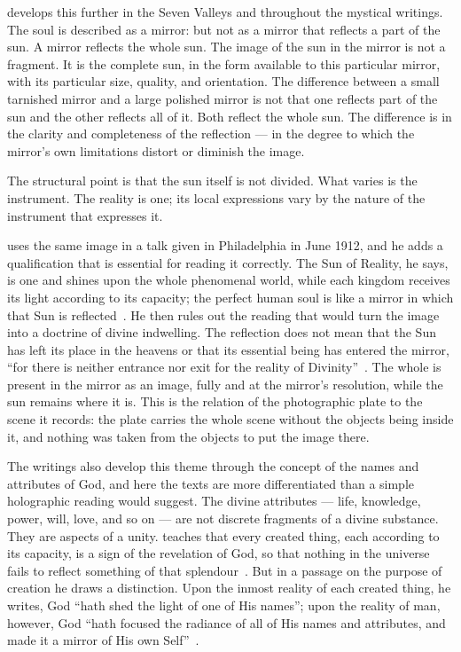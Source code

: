 \Bahaullah develops this further in the Seven Valleys and throughout the mystical writings.
The soul is described as a mirror: but not as a mirror that reflects a part of the sun.
A mirror reflects the whole sun.
The image of the sun in the mirror is not a fragment.
It is the complete sun, in the form available to this particular mirror, with its particular size, quality, and orientation.
The difference between a small tarnished mirror and a large polished mirror is not that one reflects part of the sun and the other reflects all of it.
Both reflect the whole sun.
The difference is in the clarity and completeness of the reflection --- in the degree to which the mirror's own limitations distort or diminish the image.

The structural point is that the sun itself is not divided.
What varies is the instrument.
The reality is one; its local expressions vary by the nature of the instrument that expresses it.

\AbdulBaha uses the same image in a talk given in Philadelphia in June 1912, and he adds a qualification that is essential for reading it correctly.
The Sun of Reality, he says, is one and shines upon the whole phenomenal world, while each kingdom receives its light according to its capacity; the perfect human soul is like a mirror in which that Sun is reflected~\citep[Talk~62]{PUP}.
He then rules out the reading that would turn the image into a doctrine of divine indwelling.
The reflection does not mean that the Sun has left its place in the heavens or that its essential being has entered the mirror, ``for there is neither entrance nor exit for the reality of Divinity''~\citep[Talk~62]{PUP}.
The whole is present in the mirror as an image, fully and at the mirror's resolution, while the sun remains where it is.
This is the relation of the photographic plate to the scene it records: the plate carries the whole scene without the objects being inside it, and nothing was taken from the objects to put the image there.

The \bahai writings also develop this theme through the concept of the names and attributes of God, and here the texts are more differentiated than a simple holographic reading would suggest.
The divine attributes --- life, knowledge, power, will, love, and so on --- are not discrete fragments of a divine substance.
They are aspects of a unity.
\Bahaullah teaches that every created thing, each according to its capacity, is a sign of the revelation of God, so that nothing in the universe fails to reflect something of that splendour~\citep{GleaningsBahaullah}.
But in a passage on the purpose of creation he draws a distinction.
Upon the inmost reality of each created thing, he writes, God ``hath shed the light of one of His names''; upon the reality of man, however, God ``hath focused the radiance of all of His names and attributes, and made it a mirror of His own Self''~\citep{GleaningsBahaullah}.


